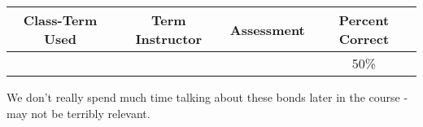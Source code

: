 
\begin{outcomes}
	\begin{center}
		\begin{tabular}{cccc}
			\hline\hline
			Class-Term Used & Term Instructor & Assessment & Percent Correct\\
			\hline
			 &  &  & 50\%\\    %
			\hline
		\end{tabular}
	\end{center}
\end{outcomes}

\begin{comments}

We don't really spend much time talking about these bonds later in the course - may not be terribly relevant.
	
\end{comments}